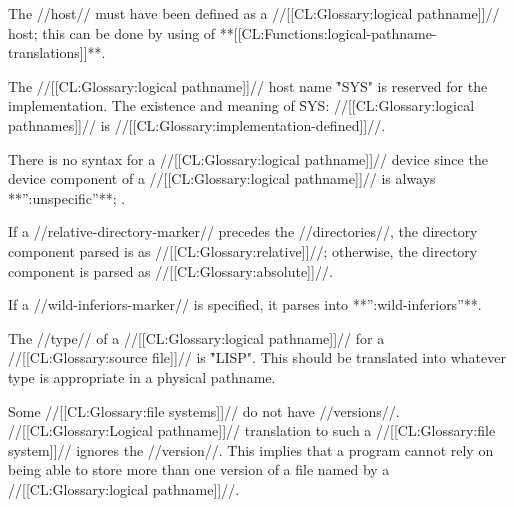 
The //host// must have been defined as a //[[CL:Glossary:logical pathname]]// host;
this can be done by using  of **[[CL:Functions:logical-pathname-translations]]**.

The //[[CL:Glossary:logical pathname]]// host name \f{"SYS"} is reserved for the implementation.
The existence and meaning of \f{SYS:} //[[CL:Glossary:logical pathnames]]// 
is //[[CL:Glossary:implementation-defined]]//.
 
\endsubsubsubsection%

 
There is no syntax for a //[[CL:Glossary:logical pathname]]// device since
the device component of a //[[CL:Glossary:logical pathname]]// is always **'':unspecific''**;
\seesection\LogicalPathCompUnspecific.

\endsubsubsubsection%


If a //relative-directory-marker// precedes the //directories//,
the directory component parsed is as //[[CL:Glossary:relative]]//;
otherwise, the directory component is parsed as //[[CL:Glossary:absolute]]//.

If a //wild-inferiors-marker// is specified,
it parses into **'':wild-inferiors''**.
 
\endsubsubsubsection%


The //type// of a //[[CL:Glossary:logical pathname]]// for a //[[CL:Glossary:source file]]//
is \f{"LISP"}.   This should be translated into whatever type is 
appropriate in a physical pathname.
 
\endsubsubsubsection%


Some //[[CL:Glossary:file systems]]// do not have //versions//. 
//[[CL:Glossary:Logical pathname]]// translation to such a //[[CL:Glossary:file system]]//
ignores the //version//.
This implies that a program cannot rely on being able to store
more than one version of a file named by a //[[CL:Glossary:logical pathname]]//.

